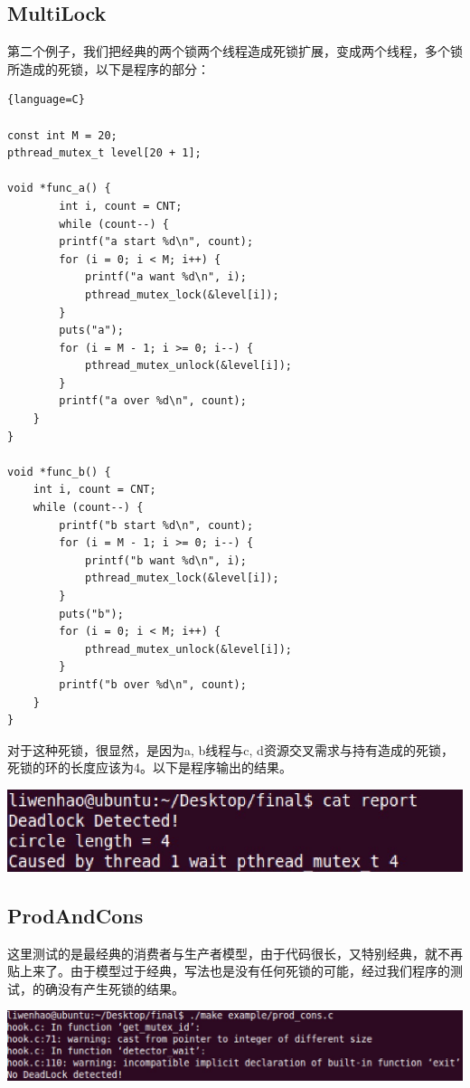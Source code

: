 \documentclass[titlepage]{article}
\begin{document}
\subsection{MultiLock}
\indent 第二个例子，我们把经典的两个锁两个线程造成死锁扩展，变成两个线程，多个锁所造成的死锁，以下是程序的部分：
\begin{lstlisting}{language=C}

const int M = 20;
pthread_mutex_t level[20 + 1];

void *func_a() {
        int i, count = CNT;
        while (count--) {
        printf("a start %d\n", count);
        for (i = 0; i < M; i++) {
            printf("a want %d\n", i);
            pthread_mutex_lock(&level[i]);
        }
        puts("a");
        for (i = M - 1; i >= 0; i--) {
            pthread_mutex_unlock(&level[i]);
        }
        printf("a over %d\n", count);
    }
}

void *func_b() {
    int i, count = CNT;
    while (count--) {
        printf("b start %d\n", count);
        for (i = M - 1; i >= 0; i--) {
            printf("b want %d\n", i);
            pthread_mutex_lock(&level[i]);
        }
        puts("b");
        for (i = 0; i < M; i++) {
            pthread_mutex_unlock(&level[i]);
        }
        printf("b over %d\n", count);
    }
}

\end{lstlisting}
\indent 对于这种死锁，很显然，是因为a, b线程与c, d资源交叉需求与持有造成的死锁，死锁的环的长度应该为4。以下是程序输出的结果。
\begin{center}
\footnotesize
\includegraphics[scale=0.4]{example2.png}
\normalsize
\end{center}

\subsection{ProdAndCons}
\indent 这里测试的是最经典的消费者与生产者模型，由于代码很长，又特别经典，就不再贴上来了。由于模型过于经典，写法也是没有任何死锁的可能，经过我们程序的测试，的确没有产生死锁的结果。
\begin{center}
	\footnotesize
	\includegraphics[scale=0.4]{example3.png}
	\normalsize
\end{center}
\end{document}
